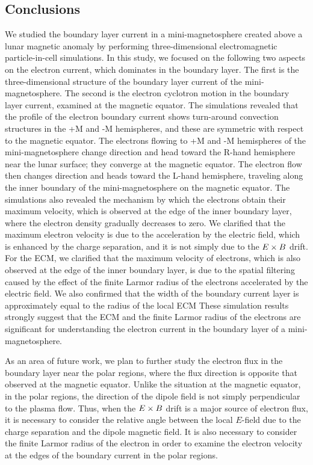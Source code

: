 \documentclass[draft,jgrga]{agutex2015}
\begin{document}
\begin{article}
\section{Conclusions}
We studied the boundary layer current in 
a mini-magnetosphere created above a lunar magnetic anomaly
by performing three-dimensional electromagnetic particle-in-cell simulations.
In this study, we focused on the following two aspects on the
electron current, which dominates in the boundary layer.
The first is the three-dimensional structure of 
the boundary layer current of the mini-magnetosphere. 
The second is the electron cyclotron motion 
in the boundary layer current, examined at the magnetic equator.
The simulations revealed that the profile of 
the electron boundary current shows 
turn-around convection structures 
in the +M and -M hemispheres, and these are symmetric with respect to the magnetic equator.
The electrons flowing to +M and -M hemispheres 
of the mini-magnetosphere
change direction and head toward the R-hand hemisphere 
near the lunar surface; they converge at the magnetic equator. 
The electron flow then changes direction and heads toward the L-hand hemisphere, 
traveling along the inner boundary of the mini-magnetosphere on the magnetic equator.
The simulations also revealed the mechanism by which the electrons obtain their maximum velocity, which is
observed at the edge of the inner boundary layer,
where the electron density gradually decreases to zero.
We clarified that the maximum electron velocity
is due to the acceleration by the electric field, which is
enhanced by the charge separation, and it is 
not simply due to the $\mbox{\boldmath $E$} \times \mbox{\boldmath $B$}$ drift.
For the ECM, we clarified that 
the maximum velocity of electrons, which is also observed 
at the edge of the inner boundary layer, is due to 
the spatial filtering caused by 
the effect of the finite Larmor radius of the electrons 
accelerated by the electric field.
We also confirmed that the width of the boundary current layer 
is approximately equal to the radius of the local ECM
These simulation results strongly suggest that the 
ECM and the finite Larmor radius of the electrons are significant 
for understanding the electron current in the boundary layer of a mini-magnetosphere. 

As an area of future work, 
we plan to further study the electron flux in the boundary layer 
near the polar regions, where the flux direction is opposite 
that observed at the magnetic equator.
Unlike the situation at the magnetic equator, in the polar regions,
the direction of the dipole field is not simply 
perpendicular to the plasma flow. 
Thus, when
the $\mbox{\boldmath $E$} \times \mbox{\boldmath $B$}$ drift 
is a major source of electron flux, it is necessary to consider the relative angle between
the local $E$-field due to the charge separation and 
the dipole magnetic field.
It is also necessary to consider the finite Larmor radius 
of the electron in order to examine the electron velocity 
at the edges of the boundary current in the polar regions.


\end{article}
\end{document}
